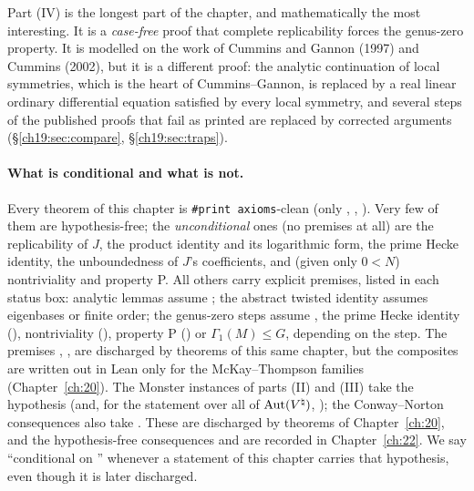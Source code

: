 Part (IV) is the longest part of the chapter, and mathematically the most interesting.  It is a \emph{case-free} proof
that complete replicability forces the genus-zero property.  It is modelled on the work of Cummins and Gannon (1997)
and Cummins (2002), but it is a different proof: the analytic continuation of local symmetries, which is the heart of
Cummins--Gannon, is replaced by a real linear ordinary differential equation satisfied by every local symmetry, and
several steps of the published proofs that fail as printed are replaced by corrected arguments (\S\ref{ch19:sec:compare},
\S\ref{ch19:sec:traps}).

\paragraph{What is conditional and what is not.}  Every theorem of this chapter is \texttt{\#print axioms}-clean
(only , , ).  Very few of them are hypothesis-free; the
\emph{unconditional} ones (no premises at all) are the replicability of $J$, the product identity 
and its logarithmic form, the prime Hecke identity, the unboundedness of $J$'s coefficients, and (given only $0<N$)
nontriviality and property P.  All others carry explicit premises, listed in each status box: analytic lemmas assume
; the abstract twisted identity assumes eigenbases or finite order; the genus-zero steps assume
, the prime Hecke identity (), nontriviality (), property P () or
$\Gamma_1(M)\le G$, depending on the step.  The premises , ,  are discharged by theorems of this
same chapter, but the composites are written out in Lean only for the McKay--Thompson families (Chapter~\ref{ch:20}).
The Monster instances of parts (II) and (III)
take the hypothesis  (and, for the statement over all of
$\operatorname{Aut}({V^{\natural}})$, ); the Conway--Norton consequences also take
.  These are discharged by theorems of
Chapter~\ref{ch:20}, and the hypothesis-free consequences  and
 are recorded in Chapter~\ref{ch:22}.  We say ``conditional on '' whenever
a statement of this chapter carries that hypothesis, even though it is later discharged.

